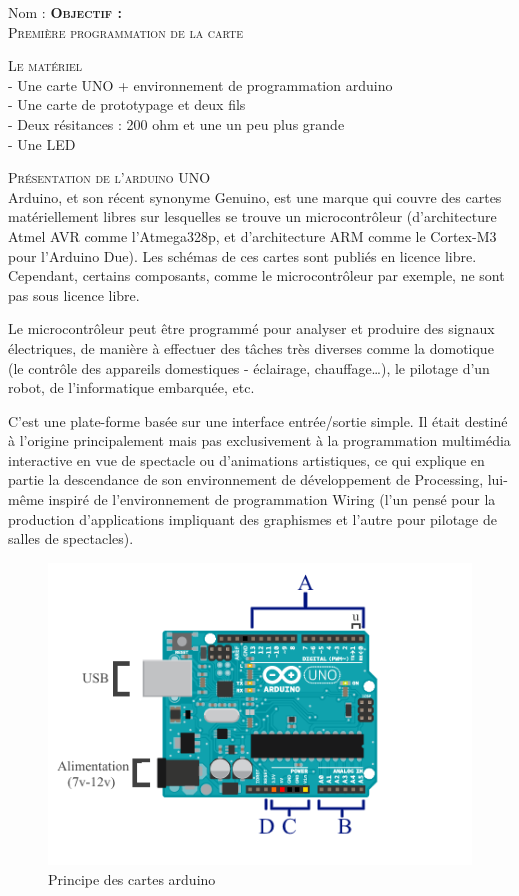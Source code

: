 \documentclass[a4paper, 11pt]{article}           %
\newcommand{\objectif}[1]{\textsc{\huge \textbf{Objectif :}\\ #1} }
\newcommand{\partie}[1]{\textsc{\Large #1} }
\begin{document}
\sffamily
\hfill Nom : {\noindent\makebox[5cm]{\dotfill}\endgraf}
\objectif{Première programmation de la carte}\\

\medskip

\partie{Le matériel}\\ %
- Une carte UNO + environnement de programmation arduino\\
- Une carte de prototypage et deux fils\\
- Deux résitances : 200 ohm et une un peu plus grande\\
- Une LED


\bigskip

\partie{Présentation de l'arduino UNO}\\  %

Arduino, et son récent synonyme Genuino, est une marque qui couvre des cartes matériellement libres sur lesquelles se trouve un microcontrôleur (d'architecture Atmel AVR comme l'Atmega328p, et d'architecture ARM comme le Cortex-M3 pour l'Arduino Due). Les schémas de ces cartes sont publiés en licence libre. Cependant, certains composants, comme le microcontrôleur par exemple, ne sont pas sous licence libre.

Le microcontrôleur peut être programmé pour analyser et produire des signaux électriques, de manière à effectuer des tâches très diverses comme la domotique (le contrôle des appareils domestiques - éclairage, chauffage…), le pilotage d'un robot, de l'informatique embarquée, etc.


C'est une plate-forme basée sur une interface entrée/sortie simple. Il était destiné à l'origine principalement mais pas exclusivement à la programmation multimédia interactive en vue de spectacle ou d'animations artistiques, ce qui explique en partie la descendance de son environnement de développement de Processing, lui-même inspiré de l'environnement de programmation Wiring (l'un pensé pour la production d'applications impliquant des graphismes et l'autre pour pilotage de salles de spectacles).

\begin{figure}[!h]
\centering
\includegraphics[width=0.85\linewidth]{CarteArduinoSimplifiee}
\caption{Principe des cartes arduino}
\label{CarteSimple}
\end{figure}
\end{document}
